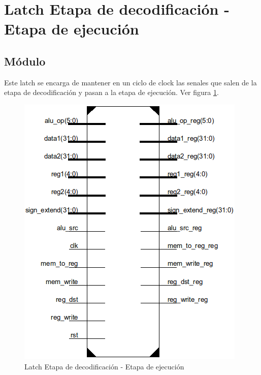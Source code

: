 \section{Latch Etapa de decodificaci\'on - Etapa de ejecuci\'on}

\subsection{M\'odulo}
Este latch se encarga de mantener en un ciclo de clock las senales que salen de la etapa de decodificaci\'on y pasan a la etapa de ejecuci\'on. Ver figura \ref{fig:Latch}.

\begin{figure}[H]
\centering
\includegraphics[scale=0.5]{img/latch_id_ex}
\caption{Latch Etapa de decodificaci\'on - Etapa de ejecuci\'on}
\label{fig:Latch}
\end{figure}

